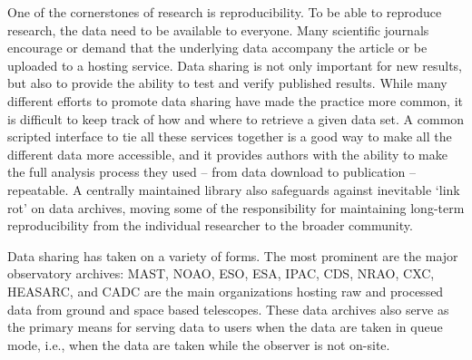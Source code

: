 \documentclass[twocolumn]{aastex62}
\begin{document}
One of the cornerstones of research is reproducibility. To be able to reproduce
research, the data need to be available to everyone. Many scientific journals
encourage or demand that the underlying data  accompany the article or be
uploaded to a hosting service. Data sharing is not only important for new
results, but also to provide the ability to test and verify published results.
While many different efforts to promote data sharing have made the practice
more common, it is difficult to keep track of how and where to retrieve a given
data set. A common scripted interface to tie all these services together is a
good way to make all the different data more accessible, and it provides
authors with the ability to make the full analysis process they used -- from
data download to publication -- repeatable.  A centrally maintained library
also safeguards against inevitable `link rot' on data archives, moving some of
the responsibility for maintaining long-term reproducibility from the
individual researcher to the broader community.

Data sharing has taken on a variety of forms.  The most prominent are the
major observatory archives: MAST, NOAO, ESO, ESA, IPAC, CDS, NRAO, CXC, HEASARC,
and CADC are the main organizations hosting raw and processed data from
ground and space based telescopes.  These data archives also serve as the
primary means for serving data to users when the data are taken in queue
mode, i.e., when the data are taken while the observer is not on-site.
\end{document}
